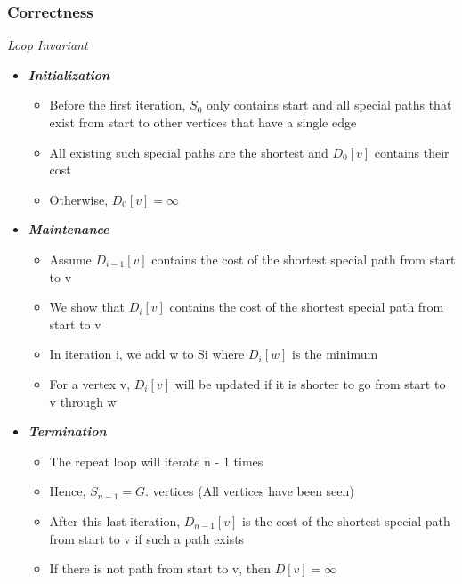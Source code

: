 \documentclass[10pt, 
a4paper, 
oneside, 
headinclude, footinclude, 
BCOR5mm]
{scrartcl}
\begin{document}
\subsubsection{Correctness}
\begin{definition}
    \textit{Loop Invariant}
    \begin{itemize}
        \item \textit{\textbf{Initialization}}
        \begin{itemize}
            \item Before the first iteration, $S_0$ only contains start and all special paths that exist from start to other vertices
            that have a single edge
            \item All existing such special paths are the shortest and $D_0[v]$ contains their cost
            \item Otherwise, $D_0[v] = \infty$
        \end{itemize}
        \item \textit{\textbf{Maintenance}}
        \begin{itemize}
            \item Assume $D_{i-1}[v]$ contains the cost of the shortest special path from start to v
            \item We show that $D_i[v]$ contains the cost of the shortest special path from start to v
            \item In iteration i, we add w to Si where $D_i[w]$ is the minimum
            \item For a vertex v, $D_i[v]$ will be updated if it is shorter to go from start to v through w
        \end{itemize}
        \item \textit{\textbf{Termination}}
        \begin{itemize}
            \item The repeat loop will iterate n - 1 times
            \item Hence, $S_{n-1} = G$. vertices (All vertices have been seen)
            \item After this last iteration, $D_{n-1}[v]$ is the cost of the shortest special path from start to v if such a path exists
            \item If there is not path from start to v, then $D[v] = \infty$
        \end{itemize}
    \end{itemize}
\end{definition}
\newpage
\end{document}
